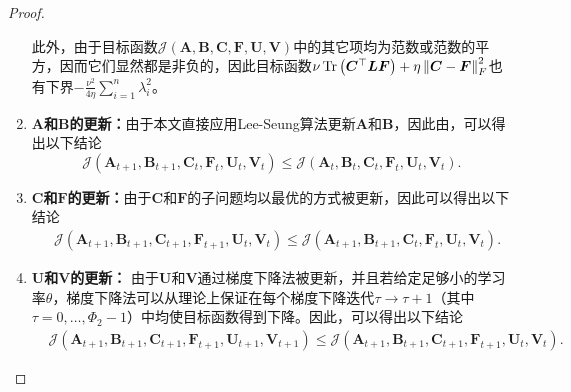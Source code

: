 \begin{proof}
\begin{enumerate}[noitemsep]
    此外，由于目标函数$\mathcal{J}(\boldsymbol{A},\boldsymbol{B},\boldsymbol{C},\boldsymbol{F},\boldsymbol{U},\boldsymbol{V})$中的其它项均为范数或范数的平方，因而它们显然都是非负的，因此目标函数$\nu\operatorname{Tr}\left(\boldsymbol{C}^{\top}\boldsymbol{L}\boldsymbol{F}\right)+\eta\left\lVert\boldsymbol{C}-\boldsymbol{F}\right\rVert_{F}^{2}$也有下界$-\frac{\nu^{2}}{4\eta}\sum_{i=1}^{n}\lambda_{i}^{2}$。\vspace{1em}
    \item \textbf{$\boldsymbol{A}$和$\boldsymbol{B}$的更新：}由于本文直接应用Lee-Seung算法更新$\boldsymbol{A}$和$\boldsymbol{B}$，因此由，可以得出以下结论
    \begin{equation*}
        \mathcal{J}(\boldsymbol{A}_{t+1},\boldsymbol{B}_{t+1},\boldsymbol{C}_{t},\boldsymbol{F}_{t},\boldsymbol{U}_{t},\boldsymbol{V}_{t})
        \leq\mathcal{J}(\boldsymbol{A}_{t},\boldsymbol{B}_{t},\boldsymbol{C}_{t},\boldsymbol{F}_{t},\boldsymbol{U}_{t},\boldsymbol{V}_{t}).
    \end{equation*}
    \item \textbf{$\boldsymbol{C}$和$\boldsymbol{F}$的更新：}由于$\boldsymbol{C}$和$\boldsymbol{F}$的子问题均以最优的方式被更新，因此可以得出以下结论
    \begin{align*}
        &\mathcal{J}(\boldsymbol{A}_{t+1},\boldsymbol{B}_{t+1},\boldsymbol{C}_{t+1},\boldsymbol{F}_{t+1},\boldsymbol{U}_{t},\boldsymbol{V}_{t})\leq\mathcal{J}(\boldsymbol{A}_{t+1},\boldsymbol{B}_{t+1},\boldsymbol{C}_{t},\boldsymbol{F}_{t},\boldsymbol{U}_{t},\boldsymbol{V}_{t}).
    \end{align*}
    \item \textbf{$\boldsymbol{U}$和$\boldsymbol{V}$的更新：} 由于$\boldsymbol{U}$和$\boldsymbol{V}$通过梯度下降法被更新，并且若给定足够小的学习率$\theta$，梯度下降法可以从理论上保证在每个梯度下降迭代$\tau\rightarrow \tau+1$（其中$\tau=0,\ldots,\Phi_{2}-1$）中均使目标函数得到下降。因此，可以得出以下结论
    \begin{align*}
        &\mathcal{J}(\boldsymbol{A}_{t+1},\boldsymbol{B}_{t+1},\boldsymbol{C}_{t+1},\boldsymbol{F}_{t+1},\boldsymbol{U}_{t+1},\boldsymbol{V}_{t+1})
        \leq\mathcal{J}(\boldsymbol{A}_{t+1},\boldsymbol{B}_{t+1},\boldsymbol{C}_{t+1},\boldsymbol{F}_{t+1},\boldsymbol{U}_{t},\boldsymbol{V}_{t}).
    \end{align*}
\end{enumerate}


\end{proof}
